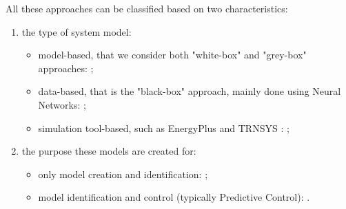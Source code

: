 \textcolor[rgb]{0,0,1}{
All these approaches can be classified based on two characteristics:
\begin{enumerate}
	\item the type of system model:
		\begin{itemize}
			\item model-based, that we consider both "white-box" and "grey-box" approaches: \cite{Shakouri2017SCS,Li2014EB,Yoon2014EB,Li2016AE,Harb2016EB,Salakij2016EB,Li2016E,Li2016EB,Hou2013,Cecconi2017EB};
			\item data-based, that is the "black-box" approach, mainly done using Neural Networks: \cite{Safa2017SCS,Neto2008EB,Magnier2010BE,Candanedo2017EB,Ascione2017E,Cecconi2017EB,Li2016AE};
			\item simulation tool-based, such as EnergyPlus \cite{energyPlus} and TRNSYS \cite{trnsys2000}: \cite{Yin2016EB,Christantoni2016EB};
		\end{itemize}
	\item the purpose these models are created for:
		\begin{itemize}
			\item only model creation and identification: \cite{Safa2017SCS,Neto2008EB,Magnier2010BE,Li2014EB,Li2016AE,Harb2016EB,Li2016EB,Candanedo2017EB,Cecconi2017EB,Ascione2017E};
			\item model identification and control (typically Predictive Control): \cite{Shakouri2017SCS,Yoon2014EB,Yin2016EB,Salakij2016EB,Li2016E,Hu2017AE}.
		\end{itemize}
\end{enumerate}
}

